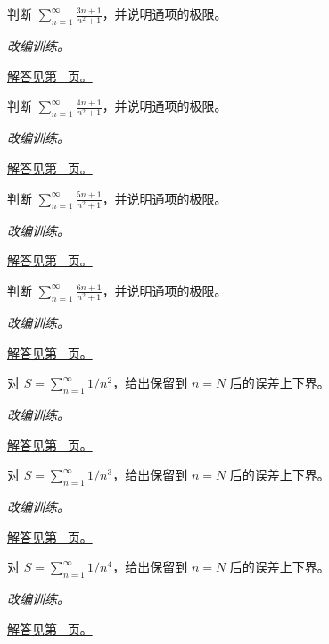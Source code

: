 \documentclass[12pt,fontset=fandol]{ctexart}
\begin{document}
\begin{example}[通项趋零与调和型发散]\label{ex:c25q15}
判断 $\displaystyle\sum_{n=1}^\infty\frac{3n+1}{n^2+1}$，并说明通项的极限。
\par\textit{改编训练。}\par\hyperref[ans:c25q15]{解答见第~\pageref{ans:c25q15} 页。}
\end{example}
\begin{example}[通项趋零与调和型发散]\label{ex:c25q16}
判断 $\displaystyle\sum_{n=1}^\infty\frac{4n+1}{n^2+1}$，并说明通项的极限。
\par\textit{改编训练。}\par\hyperref[ans:c25q16]{解答见第~\pageref{ans:c25q16} 页。}
\end{example}
\begin{example}[通项趋零与调和型发散]\label{ex:c25q17}
判断 $\displaystyle\sum_{n=1}^\infty\frac{5n+1}{n^2+1}$，并说明通项的极限。
\par\textit{改编训练。}\par\hyperref[ans:c25q17]{解答见第~\pageref{ans:c25q17} 页。}
\end{example}
\begin{example}[通项趋零与调和型发散]\label{ex:c25q18}
判断 $\displaystyle\sum_{n=1}^\infty\frac{6n+1}{n^2+1}$，并说明通项的极限。
\par\textit{改编训练。}\par\hyperref[ans:c25q18]{解答见第~\pageref{ans:c25q18} 页。}
\end{example}
\begin{example}[正项级数的尾和积分界]\label{ex:c25q19}
对 $S=\sum_{n=1}^\infty1/n^{2}$，给出保留到 $n=N$ 后的误差上下界。
\par\textit{改编训练。}\par\hyperref[ans:c25q19]{解答见第~\pageref{ans:c25q19} 页。}
\end{example}
\begin{example}[正项级数的尾和积分界]\label{ex:c25q20}
对 $S=\sum_{n=1}^\infty1/n^{3}$，给出保留到 $n=N$ 后的误差上下界。
\par\textit{改编训练。}\par\hyperref[ans:c25q20]{解答见第~\pageref{ans:c25q20} 页。}
\end{example}
\begin{example}[正项级数的尾和积分界]\label{ex:c25q21}
对 $S=\sum_{n=1}^\infty1/n^{4}$，给出保留到 $n=N$ 后的误差上下界。
\par\textit{改编训练。}\par\hyperref[ans:c25q21]{解答见第~\pageref{ans:c25q21} 页。}
\end{example}
\end{document}
